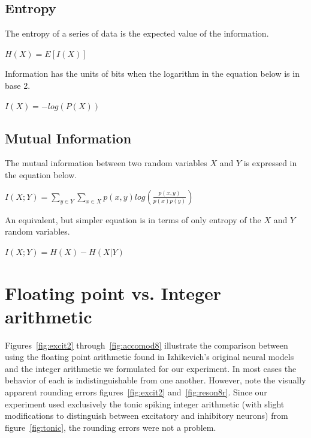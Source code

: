 \documentclass[journal]{./sty/IEEEtran}
\begin{document}
\subsection{Entropy}
The entropy of a series of data is the expected value of the information.

\vspace{0.2cm}
\begin{math}
H(X) = E[I(X)]
\end{math}
\vspace{0.2cm}

Information has the units of bits when the logarithm in the equation below is in base 2.

\vspace{0.2cm}
\begin{math}
I(X) = -log(P(X))
\end{math}
\vspace{0.2cm}


\subsection{Mutual Information}
The mutual information between two random variables $X$ and $Y$ is expressed in the equation below.

\vspace{0.2cm}
\begin{math}
I(X;Y) = \sum_{y \in Y} \sum_{x \in X} p(x, y) log( \frac{p(x,y)}{p(x) p(y)})
\end{math}
\vspace{0.2cm}

An equivalent, but simpler equation is in terms of only entropy of the $X$ and $Y$ random variables.

\vspace{0.2cm}
\begin{math}
I(X;Y) = H(X) - H(X|Y)
\end{math}
\vspace{0.2cm}

\section{Floating point vs. Integer arithmetic}
Figures~\ref{fig:excit2} through~\ref{fig:accomod8} illustrate the comparison between using the floating point arithmetic found in Izhikevich's original neural models \cite{Spikes:Izhi} and the integer arithmetic we formulated for our experiment. In most cases the behavior of each is indistinguishable from one another. However, note the visually apparent rounding errors figures~\ref{fig:excit2} and~\ref{fig:reson8r}. Since our experiment used exclusively the tonic spiking integer arithmetic (with slight modifications to distinguish between excitatory and inhibitory neurons) from figure~\ref{fig:tonic}, the rounding errors were not a problem.
\end{document}
